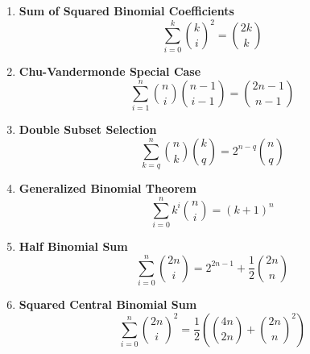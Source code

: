 \begin{enumerate}[leftmargin=*]
    \item \textbf{Sum of Squared Binomial Coefficients}
        \[\sum_{i=0}^k \binom{k}{i}^2 = \binom{2k}{k}\]
    
    \item \textbf{Chu-Vandermonde Special Case}
        \[\sum_{i=1}^n \binom{n}{i}\binom{n-1}{i-1} = \binom{2n-1}{n-1}\]
    
    \item \textbf{Double Subset Selection}
        \[\sum_{k=q}^n \binom{n}{k}\binom{k}{q} = 2^{n-q}\binom{n}{q}\]
    
    \item \textbf{Generalized Binomial Theorem}
        \[\sum_{i=0}^n k^i\binom{n}{i} = (k+1)^n\]
    
    \item \textbf{Half Binomial Sum}
        \[\sum_{i=0}^n \binom{2n}{i} = 2^{2n-1} + \frac{1}{2}\binom{2n}{n}\]
    
    \item \textbf{Squared Central Binomial Sum}
        \[\sum_{i=0}^n \binom{2n}{i}^2 = \frac{1}{2}\left(\binom{4n}{2n} + \binom{2n}{n}^2\right)\]
\end{enumerate}